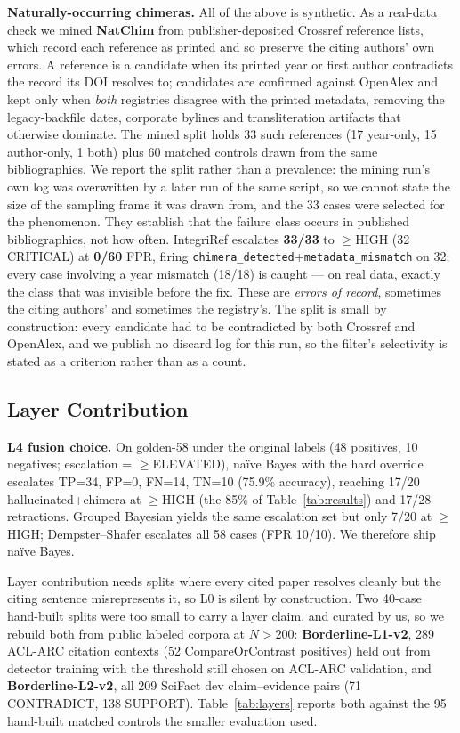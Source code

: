 \documentclass[letterpaper]{article} %
\begin{document}
\noindent\textbf{Naturally-occurring chimeras.} All of the above is synthetic. As a real-data check we mined \textbf{NatChim} from publisher-deposited Crossref reference lists, which record each reference as printed and so preserve the citing authors' own errors. A reference is a candidate when its printed year or first author contradicts the record its DOI resolves to; candidates are confirmed against OpenAlex and kept only when \emph{both} registries disagree with the printed metadata, removing the legacy-backfile dates, corporate bylines and transliteration artifacts that otherwise dominate. The mined split holds 33 such references (17 year-only, 15 author-only, 1 both) plus 60 matched controls drawn from the same bibliographies. We report the split rather than a prevalence: the mining run's own log was overwritten by a later run of the same script, so we cannot state the size of the sampling frame it was drawn from, and the 33 cases were selected for the phenomenon. They establish that the failure class occurs in published bibliographies, not how often. IntegriRef escalates \textbf{33/33} to $\geq$HIGH (32 CRITICAL) at \textbf{0/60} FPR, firing \texttt{chimera\_\allowbreak detected}+\texttt{metadata\_\allowbreak mismatch} on 32; every case involving a year mismatch (18/18) is caught --- on real data, exactly the class that was invisible before the fix. These are \emph{errors of record}, sometimes the citing authors' and sometimes the registry's. The split is small by construction: every candidate had to be contradicted by both Crossref and OpenAlex, and we publish no discard log for this run, so the filter's selectivity is stated as a criterion rather than as a count.


\subsection{Layer Contribution}
\label{ssec:layers}

\noindent\textbf{L4 fusion choice.} On golden-58 under the original labels (48 positives, 10 negatives; escalation = $\geq$ELEVATED), na\"ive Bayes with the hard override escalates TP=34, FP=0, FN=14, TN=10 (75.9\% accuracy), reaching 17/20 hallucinated+chimera at $\geq$HIGH (the 85\% of Table~\ref{tab:results}) and 17/28 retractions. Grouped Bayesian yields the same escalation set but only 7/20 at $\geq$HIGH; Dempster--Shafer escalates all 58 cases (FPR 10/10). We therefore ship na\"ive Bayes.

Layer contribution needs splits where every cited paper resolves cleanly but the citing sentence misrepresents it, so L0 is silent by construction. Two 40-case hand-built splits were too small to carry a layer claim, and curated by us, so we rebuild both from public labeled corpora at $N{>}200$: \textbf{Borderline-L1-v2}, 289 ACL-ARC citation contexts \cite{jurgens2018measuring} (52 CompareOrContrast positives) held out from detector training with the threshold still chosen on ACL-ARC validation, and \textbf{Borderline-L2-v2}, all 209 SciFact dev claim--evidence pairs (71 CONTRADICT, 138 SUPPORT). Table~\ref{tab:layers} reports both against the 95 hand-built matched controls the smaller evaluation used.
\end{document}
